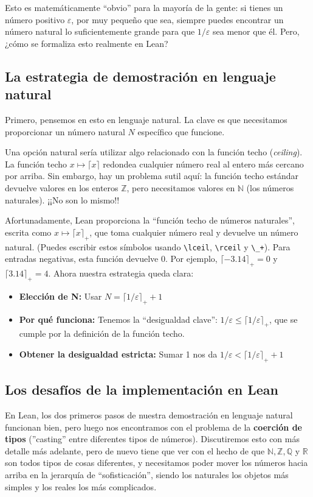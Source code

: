 Esto es matemáticamente ``obvio'' para la mayoría de la gente: si tienes un número positivo $\varepsilon$, por muy pequeño que sea, siempre puedes encontrar un número natural lo suficientemente grande para que $1/\varepsilon$ sea menor que él. Pero, ¿cómo se formaliza esto realmente en Lean?

\subsection{La estrategia de demostración en lenguaje natural}

Primero, pensemos en esto en lenguaje natural. La clave es que necesitamos proporcionar un número natural $N$ específico que funcione.

Una opción natural sería utilizar algo relacionado con la función techo (\textit{ceiling}). La función techo $x \mapsto \lceil x \rceil$ redondea cualquier número real al entero más cercano por arriba. Sin embargo, hay un problema sutil aquí: la función techo estándar devuelve valores en los enteros $\mathbb{Z}$, pero necesitamos valores en $\mathbb{N}$ (los números naturales). ¡¡No son lo mismo!!

Afortunadamente, Lean proporciona la ``función techo de números naturales'', escrita como $x \mapsto \lceil x \rceil_+$, que toma cualquier número real y devuelve un número natural. (Puedes escribir estos símbolos usando \verb|\lceil|, \verb|\rceil| y \verb|\_+|). Para entradas negativas, esta función devuelve 0. Por ejemplo, $\lceil -3.14 \rceil_+ = 0$ y $\lceil 3.14 \rceil_+ = 4$.
Ahora nuestra estrategia queda clara:
\begin{itemize}
    \item \textbf{Elección de N:} Usar $N = \lceil 1 / \varepsilon \rceil_+ + 1$
    \item \textbf{Por qué funciona:} Tenemos la ``desigualdad clave'': $1 / \varepsilon \le \lceil 1 / \varepsilon \rceil_+$, que se cumple por la definición de la función techo.
    \item \textbf{Obtener la desigualdad estricta:} Sumar 1 nos da $1 / \varepsilon < \lceil 1 / \varepsilon \rceil_+ + 1$
\end{itemize}

\subsection{Los desafíos de la implementación en Lean}

En Lean, los dos primeros pasos de nuestra demostración en lenguaje natural funcionan bien, pero luego nos encontramos con el problema de la \textbf{coerción de tipos} (''casting'' entre diferentes tipos de números). Discutiremos esto con más detalle más adelante, pero de nuevo tiene que ver con el hecho de que $\mathbb{N}, \mathbb{Z}, \mathbb{Q}$ y $\mathbb{R}$ son todos tipos de cosas diferentes, y necesitamos poder mover los números hacia arriba en la jerarquía de ``sofisticación'', siendo los naturales los objetos más simples y los reales los más complicados.

